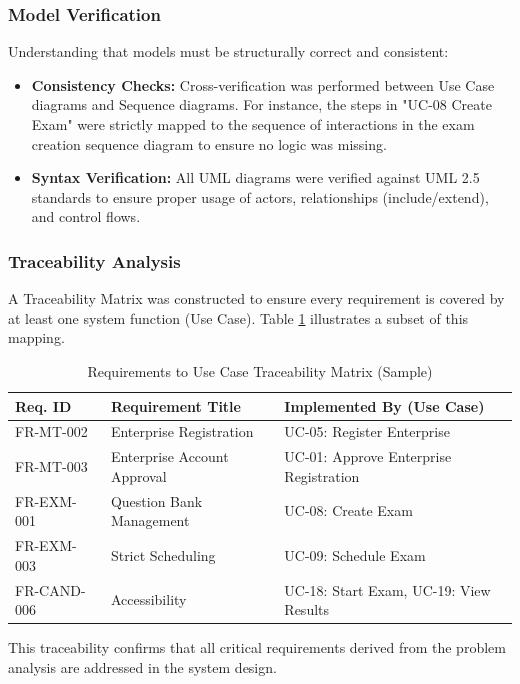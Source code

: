\subsubsection{Model Verification}
Understanding that models must be structurally correct and consistent:
\begin{itemize}
    \item \textbf{Consistency Checks:} Cross-verification was performed between Use Case diagrams and Sequence diagrams. For instance, the steps in "UC-08 Create Exam" were strictly mapped to the sequence of interactions in the exam creation sequence diagram to ensure no logic was missing.
    \item \textbf{Syntax Verification:} All UML diagrams were verified against UML 2.5 standards to ensure proper usage of actors, relationships (include/extend), and control flows.
\end{itemize}

\subsubsection{Traceability Analysis}
A Traceability Matrix was constructed to ensure every requirement is covered by at least one system function (Use Case). Table \ref{tab:traceability-matrix} illustrates a subset of this mapping.

\begin{table}[H]
\centering
\caption{Requirements to Use Case Traceability Matrix (Sample)}
\label{tab:traceability-matrix}
\begin{tabular}{|l|l|l|}
\hline
\textbf{Req. ID} & \textbf{Requirement Title} & \textbf{Implemented By (Use Case)} \\ \hline
FR-MT-002 & Enterprise Registration & UC-05: Register Enterprise \\ \hline
FR-MT-003 & Enterprise Account Approval & UC-01: Approve Enterprise Registration \\ \hline
FR-EXM-001 & Question Bank Management & UC-08: Create Exam \\ \hline
FR-EXM-003 & Strict Scheduling & UC-09: Schedule Exam \\ \hline
FR-CAND-006 & Accessibility & UC-18: Start Exam, UC-19: View Results \\ \hline
\end{tabular}
\end{table}

This traceability confirms that all critical requirements derived from the problem analysis are addressed in the system design.
